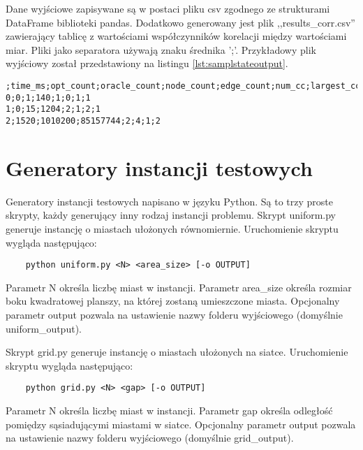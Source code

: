 Dane wyjściowe zapisywane są w postaci pliku csv zgodnego ze strukturami DataFrame biblioteki pandas.
Dodatkowo generowany jest plik ,,results\_corr.csv'' zawierający tablicę z wartościami współczynników korelacji
między wartościami miar. Pliki jako separatora używają znaku średnika ';'.
Przykładowy plik wyjściowy został przedstawiony na listingu \ref{lst:samplstateoutput}.

\begin{lstlisting}[caption={Przykład pliku wyjściowego z obliczonymi miarami num\_cc i largest\_cc}, label=lst:samplstateoutput]
;time_ms;opt_count;oracle_count;node_count;edge_count;num_cc;largest_cc
0;0;1;140;1;0;1;1
1;0;15;1204;2;1;2;1
2;1520;1010200;85157744;2;4;1;2
\end{lstlisting}


\section{Generatory instancji testowych}

Generatory instancji testowych napisano w języku Python.
Są to trzy proste skrypty, każdy generujący inny rodzaj instancji problemu.
Skrypt uniform.py generuje instancję o miastach ułożonych równomiernie.
Uruchomienie skryptu wygląda następująco:
\begin{lstlisting}
    python uniform.py <N> <area_size> [-o OUTPUT]
\end{lstlisting}
Parametr N określa liczbę miast w instancji. Parametr area\_size określa rozmiar boku kwadratowej planszy, na której zostaną umieszczone miasta.
Opcjonalny parametr output pozwala na ustawienie nazwy folderu wyjściowego (domyślnie uniform\_output).

Skrypt grid.py generuje instancję o miastach ułożonych na siatce.
Uruchomienie skryptu wygląda następująco:
\begin{lstlisting}
    python grid.py <N> <gap> [-o OUTPUT]
\end{lstlisting}
Parametr N określa liczbę miast w instancji. Parametr gap określa odległość pomiędzy sąsiadującymi miastami w siatce.
Opcjonalny parametr output pozwala na ustawienie nazwy folderu wyjściowego (domyślnie grid\_output).


